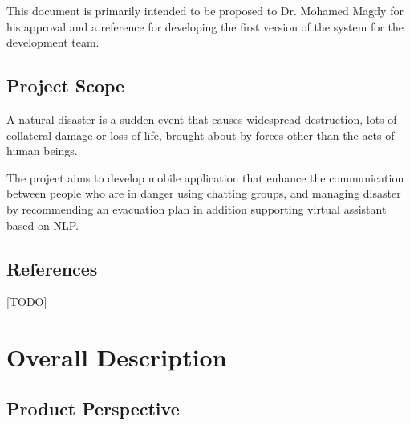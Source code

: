 \documentclass{scrreprt}
\begin{document}
This document is primarily intended to be proposed to Dr. Mohamed Magdy for his approval and a reference for developing the first version of the system for the development team.

\section{Project Scope}

A natural disaster is a sudden event that causes widespread destruction, lots of collateral damage or loss of life, brought about by forces other than the acts of human beings.

The project aims to develop mobile application that enhance the
communication between people who are in danger using chatting groups, and managing disaster by recommending an evacuation plan in addition supporting virtual assistant based on NLP.

\section{References}

[TODO]



\chapter{Overall Description}

\section{Product Perspective}
\end{document}
